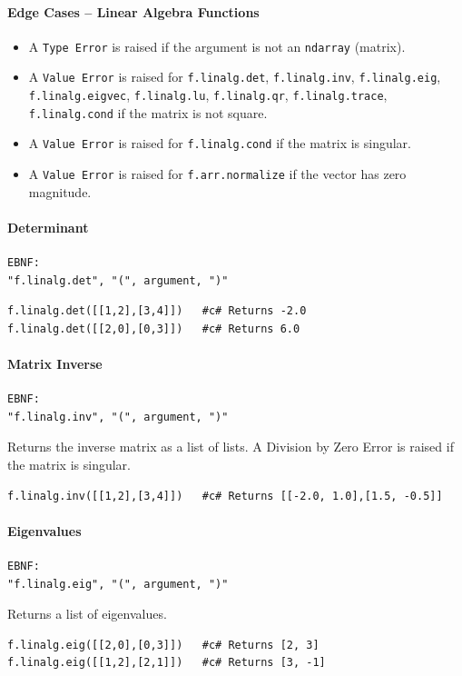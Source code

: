 \paragraph{Edge Cases -- Linear Algebra Functions}
\begin{itemize}
\item A \texttt{Type Error} is raised if the argument is not an \texttt{ndarray} (matrix).
\item A \texttt{Value Error} is raised for \texttt{f.linalg.det}, \texttt{f.linalg.inv}, \texttt{f.linalg.eig}, \texttt{f.linalg.eigvec}, \texttt{f.linalg.lu}, \texttt{f.linalg.qr}, \texttt{f.linalg.trace}, \texttt{f.linalg.cond} if the matrix is not square.
\item A \texttt{Value Error} is raised for \texttt{f.linalg.cond} if the matrix is singular.
\item A \texttt{Value Error} is raised for \texttt{f.arr.normalize} if the vector has zero magnitude.
\end{itemize}

\paragraph{Determinant}
\begin{verbatim}
EBNF:
"f.linalg.det", "(", argument, ")"
\end{verbatim}
\begin{verbatim}
f.linalg.det([[1,2],[3,4]])   #c# Returns -2.0
f.linalg.det([[2,0],[0,3]])   #c# Returns 6.0
\end{verbatim}

\paragraph{Matrix Inverse}
\begin{verbatim}
EBNF:
"f.linalg.inv", "(", argument, ")"
\end{verbatim}
Returns the inverse matrix as a list of lists. A Division by Zero Error is raised if the matrix is singular.
\begin{verbatim}
f.linalg.inv([[1,2],[3,4]])   #c# Returns [[-2.0, 1.0],[1.5, -0.5]]
\end{verbatim}

\paragraph{Eigenvalues}
\begin{verbatim}
EBNF:
"f.linalg.eig", "(", argument, ")"
\end{verbatim}
Returns a list of eigenvalues.
\begin{verbatim}
f.linalg.eig([[2,0],[0,3]])   #c# Returns [2, 3]
f.linalg.eig([[1,2],[2,1]])   #c# Returns [3, -1]
\end{verbatim}

